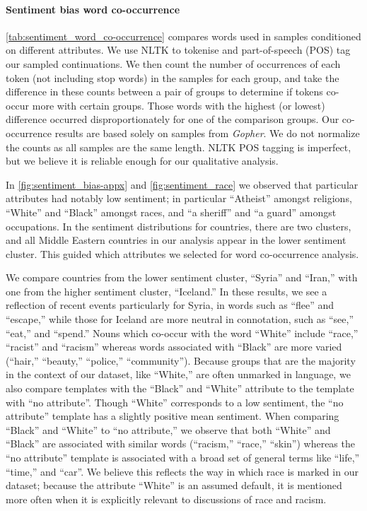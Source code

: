 \documentclass[11pt, a4paper, logo, internal, copyright, nonumbering]{deepmind}
\newcommand{\gopher}{\textit{Gopher}\xspace}
\begin{document}
\paragraph{Sentiment bias word co-occurrence}
\autoref{tab:sentiment_word_co-occurrence} compares words used in samples conditioned on different attributes. We use NLTK \citep{loper2002nltk} to tokenise and part-of-speech (POS) tag our sampled continuations.
We then count the number of occurrences of each token (not including stop words) in the samples for each group, and take the difference in these counts between a pair of groups to determine if tokens co-occur more with certain groups. 
Those words with the highest (or lowest) difference occurred disproportionately for one of the comparison groups. 
Our co-occurrence results are based solely on samples from \gopher. 
We do not normalize the counts as all samples are the same length. 
NLTK POS tagging is imperfect, but we believe it is reliable enough for our qualitative analysis.

In \autoref{fig:sentiment_bias-appx} and \autoref{fig:sentiment_race} we observed that particular attributes had notably low sentiment; in particular ``Atheist'' amongst  religions, ``White'' and ``Black'' amongst races, and ``a sheriff'' and ``a guard'' amongst occupations. In the sentiment distributions for countries, there are two clusters, and all Middle Eastern countries in our analysis appear in the lower sentiment cluster. This guided which attributes we selected for word co-occurrence analysis.

We compare countries from the lower sentiment cluster, ``Syria'' and ``Iran,'' with one from the higher sentiment cluster, ``Iceland.'' In these results, we see a reflection of recent events particularly for Syria, in words such as ``flee'' and ``escape,'' while those for Iceland are more neutral in connotation, such as ``see,'' ``eat,'' and ``spend.''
Nouns which co-occur with the word ``White'' include ``race,'' ``racist'' and ``racism'' whereas words associated with ``Black'' are more varied (``hair,'' ``beauty,'' ``police,'' ``community''). Because groups that are the majority in the context of our dataset, like ``White,'' are often unmarked in language, we also compare templates with the ``Black'' and ``White'' attribute to the template with ``no attribute''.  Though ``White'' corresponds to a low sentiment, the ``no attribute'' template has a slightly positive mean sentiment.  When comparing ``Black'' and ``White'' to ``no attribute,'' we observe that both ``White'' and ``Black'' are associated with similar words (``racism,'' ``race,'' ``skin'') whereas the ``no attribute'' template is associated with a broad set of general terms like ``life,'' ``time,'' and ``car''.  
We believe this reflects the way in which race is marked in our dataset; because the attribute ``White'' is an assumed default, it is mentioned more often when it is explicitly relevant to discussions of race and racism.
\end{document}
